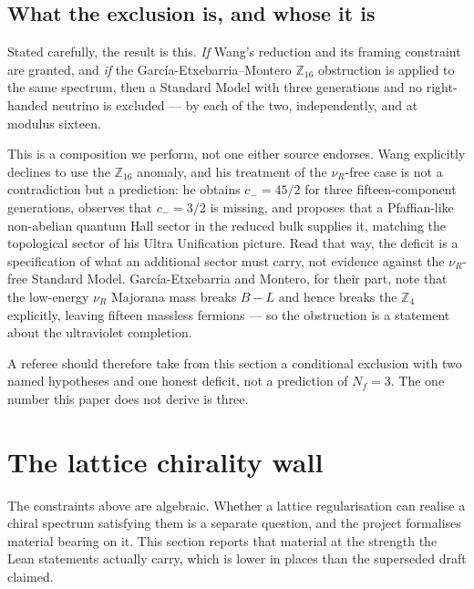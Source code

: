 \documentclass[aps,prd,reprint,nofootinbib,superscriptaddress]{revtex4-2}
\begin{document}
\subsection{What the exclusion is, and whose it is}

Stated carefully, the result is this. \emph{If} Wang's reduction and its
framing constraint are granted, and \emph{if} the
Garc\'ia-Etxebarria--Montero $\mathbb{Z}_{16}$ obstruction is applied to
the same spectrum, then a Standard Model with three generations and no
right-handed neutrino is excluded --- by each of the two, independently,
and at modulus sixteen.

This is a composition we perform, not one either source endorses. Wang
explicitly declines to use the $\mathbb{Z}_{16}$ anomaly, and his
treatment of the $\nu_R$-free case is not a contradiction but a
prediction: he obtains $c_{-} = 45/2$ for three fifteen-component
generations, observes that $c_{-} = 3/2$ is missing, and proposes that a
Pfaffian-like non-abelian quantum Hall sector in the reduced bulk
supplies it, matching the topological sector of his Ultra Unification
picture. Read that way, the deficit is a specification of what an
additional sector must carry, not evidence against the $\nu_R$-free
Standard Model. Garc\'ia-Etxebarria and Montero, for their part, note
that the low-energy $\nu_R$ Majorana mass breaks $B-L$ and hence breaks
the $\mathbb{Z}_4$ explicitly, leaving fifteen massless fermions --- so
the obstruction is a statement about the ultraviolet completion.

A referee should therefore take from this section a conditional
exclusion with two named hypotheses and one honest deficit, not a
prediction of $N_f = 3$. The one number this paper does not derive is
three.



\section{The lattice chirality wall}
\label{sec:chirality-wall}

The constraints above are algebraic. Whether a lattice regularisation can
realise a chiral spectrum satisfying them is a separate question, and the
project formalises material bearing on it. This section reports that
material at the strength the Lean statements actually carry, which is
lower in places than the superseded draft claimed.
\end{document}
